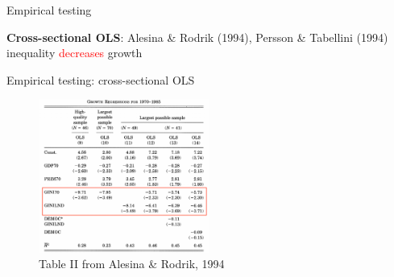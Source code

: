 \documentclass[aspectratio=169]{beamer}
\begin{document}
\begin{frame}{Empirical testing}

\begin{outline}
\1 \textbf{Cross-sectional OLS}: Alesina \& Rodrik (1994), Persson 
\& Tabellini (1994)
\2 inequality \textcolor{red}{decreases} growth

\vspace{2em} 


\end{outline}

\end{frame}
\begin{frame}{Empirical testing: cross-sectional OLS}

\begin{figure}
\includegraphics[width=0.5\textwidth]{alesina_tab.png}
\caption*{\footnotesize{Table II from Alesina \& Rodrik, 1994} }
\end{figure}

\end{frame} 
\end{document}
